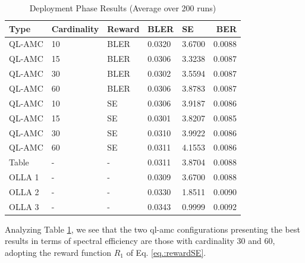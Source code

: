 \begin{table}[tb]
\centering
\caption{Deployment Phase Results (Average over 200 runs)}
\label{tab:amc-deploy-results}
\begin{tabularx}{\columnwidth}{l X X X X r}
  \toprule
  Type    & Cardinality &      Reward  &  BLER &     SE  &    BER \\
  \midrule
   QL-AMC &     10 &           BLER   & 0.0320 &  3.6700 & 0.0088 \\
   QL-AMC &     15 &           BLER   & 0.0306 &  3.3238 & 0.0087 \\
   QL-AMC &     30 &           BLER   & 0.0302 &  3.5594 & 0.0087 \\
   QL-AMC &     60 &           BLER   & 0.0306 &  3.8783 & 0.0087 \\
   QL-AMC &     10 &           SE     & 0.0306 &  3.9187 & 0.0086 \\
   QL-AMC &     15 &           SE     & 0.0301 &  3.8207 & 0.0085 \\
   QL-AMC &     30 &           SE     & 0.0310 &  3.9922 & 0.0086 \\
   QL-AMC &     60 &           SE     & 0.0311 &  4.1553 & 0.0086 \\
    Table &      - &           -      & 0.0311 &  3.8704 & 0.0088 \\
   OLLA 1 &      - &           -      & 0.0309 &  3.6700 & 0.0088 \\
   OLLA 2 &      - &           -      & 0.0330 &  1.8511 & 0.0090 \\
   OLLA 3 &      - &           -      & 0.0343 &  0.9999 & 0.0092 \\
  \bottomrule
\end{tabularx}
\end{table}

Analyzing Table \ref{tab:amc-deploy-results}, we see that the two \gls{ql-amc} configurations presenting the best results in terms of spectral efficiency are those with cardinality 30 and 60, adopting the reward function $R_1$ of Eq. \eqref{eq.:rewardSE}.
%

